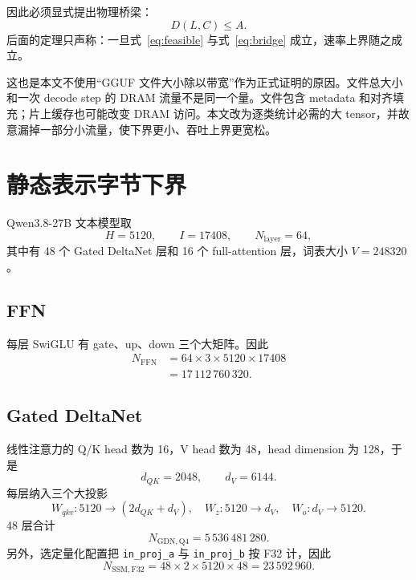 \documentclass[11pt,a4paper]{ctexart}
\begin{document}
因此必须显式提出物理桥梁：
\begin{equation}
  D(L,C)\le A.
  \label{eq:bridge}
\end{equation}
后面的定理只声称：一旦式~\eqref{eq:feasible} 与式~\eqref{eq:bridge} 成立，速率上界随之成立。

这也是本文不使用“GGUF 文件大小除以带宽”作为正式证明的原因。文件总大小和一次 decode step 的 DRAM 流量不是同一个量。文件包含 metadata 和对齐填充；片上缓存也可能改变 DRAM 访问。本文改为逐类统计必需的大 tensor，并故意漏掉一部分小流量，使下界更小、吞吐上界更宽松。

\section{静态表示字节下界}

Qwen3.8-27B 文本模型取
\begin{equation}
  H=5120,\qquad I=17408,\qquad N_{\mathrm{layer}}=64,
\end{equation}
其中有 48 个 Gated DeltaNet 层和 16 个 full-attention 层，词表大小 $V=248320$。

\subsection{FFN}
每层 SwiGLU 有 gate、up、down 三个大矩阵。因此
\begin{equation}
\begin{aligned}
N_{\mathrm{FFN}}
&=64\times3\times5120\times17408\\
&=17\,112\,760\,320.
\end{aligned}
\label{eq:ffn}
\end{equation}

\subsection{Gated DeltaNet}
线性注意力的 Q/K head 数为 16，V head 数为 48，head dimension 为 128，于是
\begin{equation}
 d_{QK}=2048,\qquad d_V=6144.
\end{equation}
每层纳入三个大投影
\[
W_{qkv}:5120\to(2d_{QK}+d_V),\quad
W_z:5120\to d_V,\quad
W_o:d_V\to5120.
\]
48 层合计
\begin{equation}
  N_{\mathrm{GDN,Q4}}=5\,536\,481\,280.
  \label{eq:gdn}
\end{equation}
另外，选定量化配置把 \texttt{in\_proj\_a} 与 \texttt{in\_proj\_b} 按 F32 计，因此
\begin{equation}
  N_{\mathrm{SSM,F32}}=48\times2\times5120\times48
  =23\,592\,960.
  \label{eq:ssm}
\end{equation}
\end{document}
